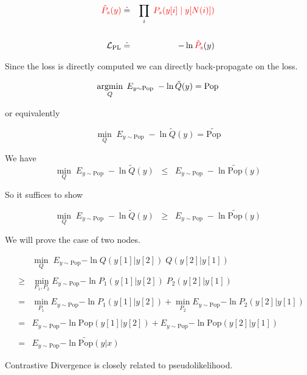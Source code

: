 {\vfill
\begin{eqnarray*}
  {\color{red} \tilde{P}_s(y)} & \doteq & \prod_i \;{\color{red} P_s(y[i] \;|\;y[N(i)])} \\
  \\
  {\cal L}_{\mathrm{PL}} & \doteq & - \ln {\color{red} \tilde{P}_s}(y)
\end{eqnarray*}

\vfill
Since the loss is directly computed we can directly back-propagate on the loss.



{\color{red} $$\operatorname*{argmin}_Q \; E_{y \sim \mathrm{Pop}} \;-\ln \tilde{Q}(y) = \mathrm{Pop}$$}

\vfill
or equivalently


\vfill
{\color{red} $$\min_Q \; E_{y \sim \mathrm{Pop}} \;-\ln \tilde{Q}(y) = \widetilde{\mathrm{Pop}}$$}
\vfill


We have
$$\min_{Q} \;E_{y \sim \mathrm{Pop}}\;-\ln \tilde{Q}(y) \;\;\leq \;\; E_{y \sim \mathrm{Pop}}\;-\ln \widetilde{\mathrm{Pop}}(y)$$

\vfill
So it suffices to show

$$\min_{Q} \;E_{y \sim \mathrm{Pop}}\;-\ln \tilde{Q}(y) \;\;\geq \;\; E_{y \sim \mathrm{Pop}}\;-\ln \widetilde{\mathrm{Pop}}(y)$$


We will prove the case of two nodes.

\vfill
\begin{eqnarray*}
  & & \min_Q \;E_{y\sim \mathrm{Pop}}{-\ln Q(y[1]|y[2])\;Q(y[2]|y[1])} \\
  \\
  & \geq & \min_{P_1,P_2} E_{y \sim \mathrm{Pop}}{-\ln P_1(y[1]|y[2])\;P_2(y[2]|y[1])} \\
  \\
  & = & \min_{P_1} E_{y \sim \mathrm{Pop}}{-\ln P_1(y[1]|y[2])} + \min_{P_2} E_{y \sim \mathrm{Pop}}{-\ln P_2(y[2]|y[1])} \\
  \\
  & = & E_{y \sim \mathrm{Pop}}{-\ln \mathrm{Pop}(y[1]|y[2])} + E_{y \sim \mathrm{Pop}}{-\ln \mathrm{Pop}(y[2]|y[1])} \\
  \\
  & = & E_{y \sim \mathrm{Pop}}{-\ln \widetilde{\mathrm{Pop}}(y|x)}
\end{eqnarray*}



Contrastive Divergence is closely related to pseudolikelihood.

}
